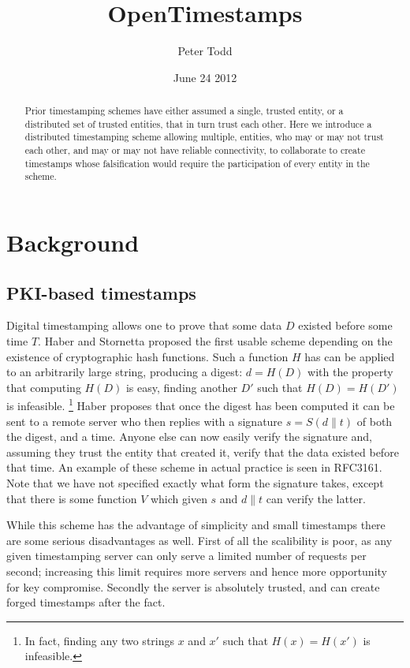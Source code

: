 \documentclass{article}
\begin{document}
\title{OpenTimestamps}
\author{Peter Todd}
\date{June 24 2012}
\maketitle

\begin{abstract}
Prior timestamping schemes have either assumed a single, trusted entity, or a
distributed set of trusted entities, that in turn trust each other. Here we
introduce a distributed timestamping scheme allowing multiple, entities, who
may or may not trust each other, and may or may not have reliable connectivity,
to collaborate to create timestamps whose falsification would require the
participation of every entity in the scheme.
\end{abstract}

\section{Background}

\subsection{PKI-based timestamps}

Digital timestamping allows one to prove that some data $D$ existed before some
time $T$. Haber and Stornetta proposed\cite{Haber91howto} the first usable
scheme depending on the existence of cryptographic hash functions. Such a
function $H$ has can be applied to an arbitrarily large string, producing a
digest: $d=H(D)$ with the property that computing $H(D)$ is easy, finding
another $D'$ such that $H(D)=H(D')$ is infeasible. \footnote{In fact, finding
any two strings $x$ and $x'$ such that $H(x)=H(x')$ is infeasible.} Haber
proposes that once the digest has been computed it can be sent to a remote
server who then replies with a signature $s=S(d\| t)$ of both the digest, and a
time. Anyone else can now easily verify the signature and, assuming they trust
the entity that created it, verify that the data existed before that time. An
example of these scheme in actual practice is seen in RFC3161.\cite{rfc3161}
Note that we have not specified exactly what form the signature takes, except
that there is some function $V$ which given $s$ and $d\| t$ can verify the
latter.

While this scheme has the advantage of simplicity and small timestamps there
are some serious disadvantages as well. First of all the scalibility is poor,
as any given timestamping server can only serve a limited number of requests
per second; increasing this limit requires more servers and hence more
opportunity for key compromise. Secondly the server is absolutely trusted, and
can create forged timestamps after the fact.
\end{document}
